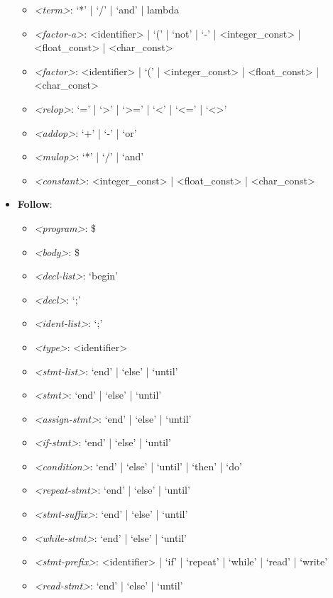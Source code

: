 \begin{itemize}
\begin{itemize}
            \item \textit{<term>}: `*' | `/' | `and' | lambda
            \item \textit{<factor-a>}: <identifier> | `(' | `not' | `-' | <integer_const> | <float_const> | <char_const>
            \item \textit{<factor>}: <identifier> | `(' | <integer_const> | <float_const> | <char_const>
            \item \textit{<relop>}: `=' | `>' | `>=' | `<' | `<=' | `<>'
            \item \textit{<addop>}: `+' | `-' | `or'
            \item \textit{<mulop>}: `*' | `/' | `and'
            \item \textit{<constant>}: <integer_const> | <float_const> | <char_const>
        \end{itemize}
        \item \textbf{Follow}:
        \begin{itemize}
            \item \textit{<program>}: \$
            \item \textit{<body>}: \$
            \item \textit{<decl-list>}: `begin'
            \item \textit{<decl>}: `;'
            \item \textit{<ident-list>}: `;'
            \item \textit{<type>}: <identifier> 
            \item \textit{<stmt-list>}: `end' | `else' | `until'
            \item \textit{<stmt>}: `end' | `else' | `until'
            \item \textit{<assign-stmt>}: `end' | `else' | `until'
            \item \textit{<if-stmt>}: `end' | `else' | `until'
            \item \textit{<condition>}: `end' | `else' | `until' | `then' | `do'
            \item \textit{<repeat-stmt>}: `end' | `else' | `until'
            \item \textit{<stmt-suffix>}: `end' | `else' | `until'
            \item \textit{<while-stmt>}: `end' | `else' | `until'
            \item \textit{<stmt-prefix>}: <identifier> | `if' | `repeat' | `while' | `read' | `write'
            \item \textit{<read-stmt>}: `end' | `else' | `until' 

\end{itemize}
\end{itemize}
